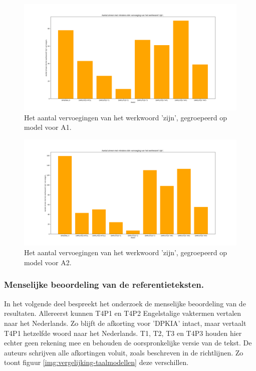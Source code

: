 \begin{figure}[H]
	\includegraphics[width=\linewidth]{img/boxplot-tobe-a1.png}
	\caption{Het aantal vervoegingen van het werkwoord 'zijn', gegroepeerd op model voor A1.}
	\label{img:histplot-tobe-a1}
\end{figure}

\begin{figure}[H]
	\includegraphics[width=\linewidth]{img/boxplot-tobe-a2.png}
	\caption{Het aantal vervoegingen van het werkwoord 'zijn', gegroepeerd op model voor A2.}
	\label{img:histplot-tobe-a2}
\end{figure}

\subsubsection{Menselijke beoordeling van de referentieteksten.}

In het volgende deel bespreekt het onderzoek de menselijke beoordeling van de resultaten. Allereerst kunnen T4P1 en T4P2 Engelstalige vaktermen vertalen naar het Nederlands. Zo blijft de afkorting voor 'DPKIA' intact, maar vertaalt T4P1 hetzelfde woord naar het Nederlands.  T1, T2, T3 en T4P3 houden hier echter geen rekening mee en behouden de oorspronkelijke versie van de tekst. De auteurs schrijven alle afkortingen voluit, zoals beschreven in de richtlijnen. Zo toont figuur \ref{img:vergelijking-taalmodellen} deze verschillen.

